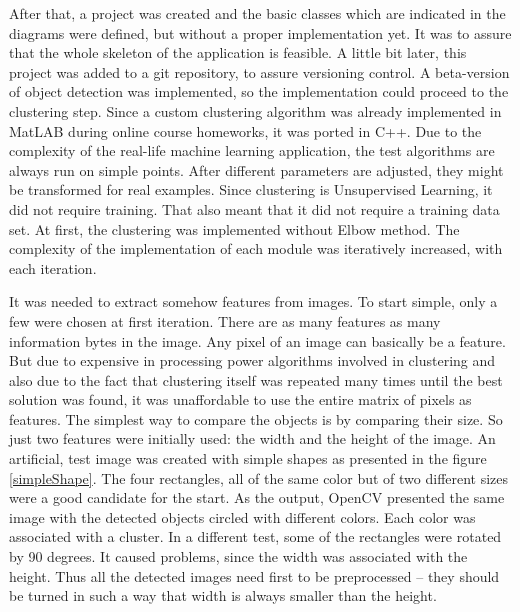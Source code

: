         After that, a project was created and the basic classes which are indicated in the diagrams were defined, but without a proper implementation yet. It was to assure that the whole skeleton of the application is feasible. A little bit later, this project was added to a git repository, to assure versioning control. A beta-version of object detection was implemented, so the implementation could proceed to the clustering step. Since a custom clustering algorithm was already implemented in MatLAB during online course homeworks, it was ported in C++. Due to the complexity of the real-life machine learning application, the test algorithms are always run on simple points. After different parameters are adjusted, they might be transformed for real examples. Since clustering is Unsupervised Learning, it did not require training. That also meant that it did not require a training data set. At first, the clustering was implemented without Elbow method. The complexity of the implementation of each module was iteratively increased, with each iteration. 


        It was needed to extract somehow features from images. To start simple, only a few were chosen at first iteration. There are as many features as many information bytes in the image. Any pixel of an image can basically be a feature. But due to expensive in processing power algorithms involved in clustering and also due to the fact that clustering itself was repeated many times until the best solution was found, it was unaffordable to use the entire matrix of pixels as features. The simplest way to compare the objects is by comparing their size. So just two features were initially used: the width and the height of the image. An artificial, test image was created with simple shapes as presented in the figure \ref{simpleShape}. The four rectangles, all of the same color but of two different sizes were a good candidate for the start. As the output, OpenCV presented the same image with the detected objects circled with different colors. Each color was associated with a cluster. In a different test, some of the rectangles were rotated by 90 degrees. It caused problems, since the width was associated with the height. Thus all the detected images need first to be preprocessed -- they should be turned in such a way that width is always smaller than the height. 


